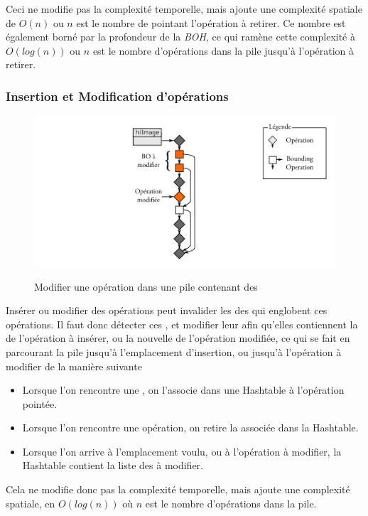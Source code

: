 			Ceci ne modifie pas la complexité temporelle, mais ajoute une complexité spatiale
			de $O(n)$ ou $n$ est le nombre de \BO pointant l'opération à retirer. Ce nombre est également borné par
			la profondeur de la \emph{BOH}, ce qui ramène cette complexité à $O(log(n))$ ou $n$ est le nombre d'opérations dans
			la pile jusqu'à l'opération à retirer. 

			\subsubsection{Insertion et Modification d'opérations}
			\begin{figure}[ht]
				\centering
				\includegraphics[width=\textwidth]{images/bo-modify} 
				\label{fig:bo-modify}
				\caption{Modifier une opération dans une pile contenant des \BO}
			\end{figure}
			Insérer ou modifier des opérations peut invalider les \BB des \BO qui englobent ces opérations. Il faut
			donc détecter ces \BO, et modifier leur \BB afin qu'elles contiennent la \BB de l'opération à insérer, ou la
			nouvelle \BB de l'opération modifiée, ce qui se fait en parcourant la pile jusqu'à l'emplacement d'insertion,
			ou jusqu'à l'opération à modifier de la manière suivante
			\begin{itemize}
				\item Lorsque l'on rencontre une \BO, on l'associe dans une Hashtable à l'opération pointée.
				\item Lorsque l'on rencontre une opération, on retire la \BO associée dans la Hashtable.
				\item Lorsque l'on arrive à l'emplacement voulu, ou à l'opération à modifier, la Hashtable
				contient la liste des \BO à modifier.
			\end{itemize}
			Cela ne modifie donc pas la complexité temporelle, mais ajoute une complexité spatiale, en $O(log(n))$ où $n$
			est le nombre d'opérations dans la pile.

